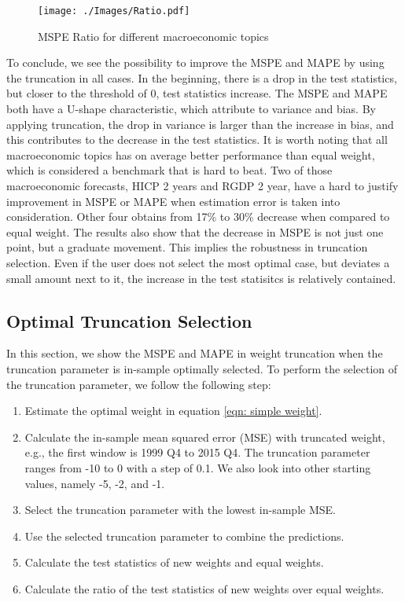 \documentclass[11pt]{article}
\begin{document}
\begin{figure}[!h]
	\centering
	\texttt{[image: ./Images/Ratio.pdf]}
	\caption{MSPE Ratio for different macroeconomic topics}\label{fig: Ratio sub}
\end{figure}

To conclude, we see the possibility to improve the MSPE and MAPE by using the truncation in all cases. In the beginning, there is a drop in the test statistics, but closer to the threshold of 0, test statistics increase. The MSPE and MAPE both have a U-shape characteristic, which attribute to variance and bias. By applying truncation, the drop in variance is larger than the increase in bias, and this contributes to the decrease in the test statistics. It is worth noting that all macroeconomic topics has on average better performance than equal weight, which is considered a benchmark that is hard to beat. Two of those  macroeconomic forecasts, HICP 2 years and RGDP 2 year, have a hard to justify improvement in MSPE or MAPE when estimation error is taken into consideration. Other four obtains from 17\% to 30\% decrease when compared to equal weight. The results also show that the decrease in MSPE is not just one point, but a graduate movement. This implies the robustness in truncation selection. Even if the user does not select the most optimal case, but deviates a small amount next to it, the increase in the test statisitcs is relatively contained.

\subsection{Optimal Truncation Selection}\label{out-of-sample-truncation-selection}

In this section, we show the MSPE and MAPE in weight truncation when
the truncation parameter is in-sample optimally selected. To perform the
selection of the truncation parameter, we follow the following step:

\begin{enumerate}
\def\labelenumi{\arabic{enumi}.}
\item
Estimate the optimal weight in equation \ref{eqn: simple weight}.
\item
Calculate the in-sample mean squared error (MSE) with truncated weight, e.g., the first window is 1999 Q4 to 2015 Q4. The
truncation parameter ranges from -10 to 0 with a step of 0.1. We also look into other starting values, namely -5, -2, and -1.
\item
Select the truncation parameter with the lowest in-sample MSE.
\item
Use the selected truncation parameter to combine the predictions.
\item
Calculate the test statistics of new weights and equal weights.
\item
Calculate the ratio of the test statistics of new weights over equal weights.
\end{enumerate}
\end{document}
